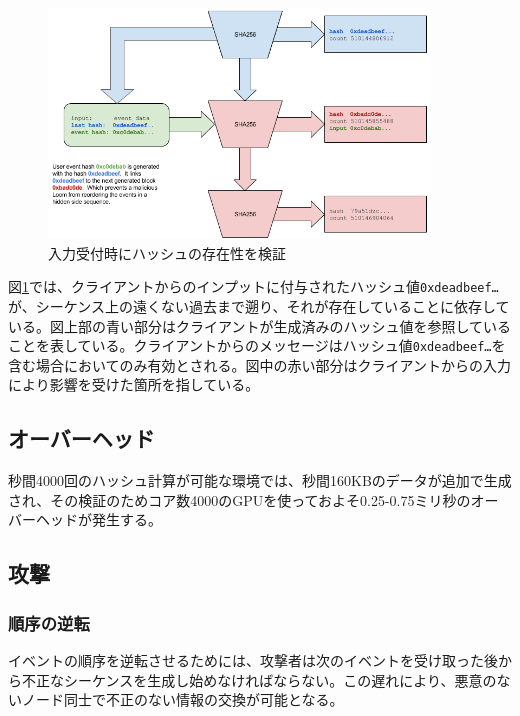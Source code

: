 \documentclass[12pt]{ltjsarticle}
\begin{document}
\begin{figure}
  \begin{center}
    \centering
    \includegraphics[width=0.9\textwidth]{../../figures/fig_6.png}
    \caption[Fig 6]{入力受付時にハッシュの存在性を検証\label{fig:poh_consistency}}
  \end{center}
  \end{figure}

図\ref{fig:poh_consistency}では、クライアントからのインプットに付与されたハッシュ値\texttt{0xdeadbeef\ldots}が、シーケンス上の遠くない過去まで遡り、それが存在していることに依存している。図上部の青い部分はクライアントが生成済みのハッシュ値を参照していることを表している。クライアントからのメッセージはハッシュ値\texttt{0xdeadbeef\ldots}を含む場合においてのみ有効とされる。図中の赤い部分はクライアントからの入力により影響を受けた箇所を指している。

\subsection{オーバーヘッド}
秒間4000回のハッシュ計算が可能な環境では、秒間160KBのデータが追加で生成され、その検証のためコア数4000のGPUを使っておよそ0.25-0.75ミリ秒のオーバーヘッドが発生する。

\subsection{攻撃}
\subsubsection{順序の逆転}
 イベントの順序を逆転させるためには、攻撃者は次のイベントを受け取った後から不正なシーケンスを生成し始めなければならない。この遅れにより、悪意のないノード同士で不正のない情報の交換が可能となる。
\end{document}

